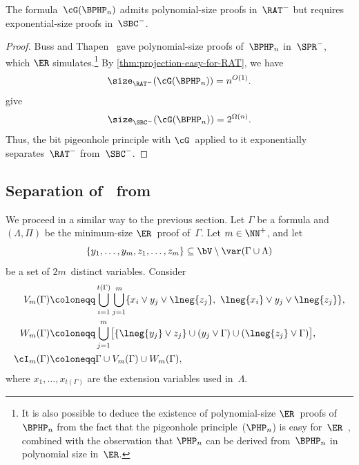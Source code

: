 \documentclass[12pt]{article}
\begin{document}
\begin{theorem}\label{thm:separation-RAT-from-SBC}
  The formula~$\cG(\BPHP_n)$ admits polynomial-size proofs in~$\RAT^-$
  but requires exponential-size proofs in~$\SBC^-$.
\end{theorem}
\begin{proof}
  Buss and Thapen~\cite[Theorem~4.4]{BT21}
  gave polynomial-size proofs of~$\BPHP_n$
  in~$\SPR^-$, which $\ER$ simulates.\footnote{
    It is also possible to deduce the existence of polynomial-size $\ER$~proofs
    of~$\BPHP_n$ from the fact that the pigeonhole principle~($\PHP_n$)
    is easy for~$\ER$~\cite{Coo76}, combined with the observation
    that $\PHP_n$ can be derived from~$\BPHP_n$ in polynomial size in~$\ER$.}
  By \cref{thm:projection-easy-for-RAT}, we have
  \begin{equation*}
    \size_{\RAT^-}(\cG(\BPHP_n)) = n^{O(1)}.
  \end{equation*}
   give
  \begin{equation*}
    \size_{\SBC^-}(\cG(\BPHP_n)) = 2^{\Omega(n)}.
  \end{equation*}
  Thus, the bit pigeonhole principle with $\cG$~applied to it
  exponentially separates~$\RAT^-$ from~$\SBC^-$.
\end{proof}

\subsection{Separation of~ from~}
\label{sec:GER-from-SBC}

We proceed in a similar way to the previous section.
Let $\Gamma$ be a formula and $(\Lambda, \Pi)$ be
the minimum-size $\ER$~proof of~$\Gamma$.
Let $m \in \NN^+$, and let
\begin{equation*}
  \left\{y_1, \dots, y_m, z_1, \dots, z_m\right\}
  \subseteq \bV \setminus \var(\Gamma \cup \Lambda)
\end{equation*}
be a set of $2m$~distinct variables.
Consider
\begin{align}\label{eq:blocked-pair-with-unsatisfiable-projection-transformation}
  \begin{split}
    V_m(\Gamma)
    &\coloneqq \bigcup_{i = 1}^{t(\Gamma)} \bigcup_{j = 1}^m
      \{x_i \lor y_j \lor \lneg{z_j},\ \lneg{x_i} \lor y_j \lor \lneg{z_j}\}, \\
    W_m(\Gamma)
    &\coloneqq \bigcup_{j = 1}^m \bigl[
      \{\lneg{y_j} \lor z_j\}
      \cup (y_j \lor \Gamma)
      \cup (\lneg{z_j} \lor \Gamma)
      \bigr], \\
    \cI_m(\Gamma)
    &\coloneqq \Gamma \cup V_m(\Gamma) \cup W_m(\Gamma),
  \end{split}
\end{align}
where $x_1, \dots, x_{t(\Gamma)}$ are the extension variables used in~$\Lambda$.
\end{document}
